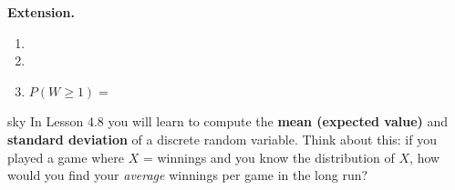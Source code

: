\documentclass[10pt]{article}
\begin{document}
\vspace{0.1in}

\begin{extensionbox}
\small
\textbf{Extension.}
\begin{enumerate}[leftmargin=1.5em, itemsep=6pt]
  \item {}
  \item {}

  \item $P(W \ge 1) = $ 
\end{enumerate}
\end{extensionbox}

\vspace{0.1in}

\begin{blurbbox}{sky}
\small
In Lesson 4.8 you will learn to compute the \textbf{mean (expected value)} and
\textbf{standard deviation} of a discrete random variable. Think about this: if you
played a game where $X$ = winnings and you know the distribution of $X$, how would you
find your \emph{average} winnings per game in the long run?
\end{blurbbox}
\end{document}
